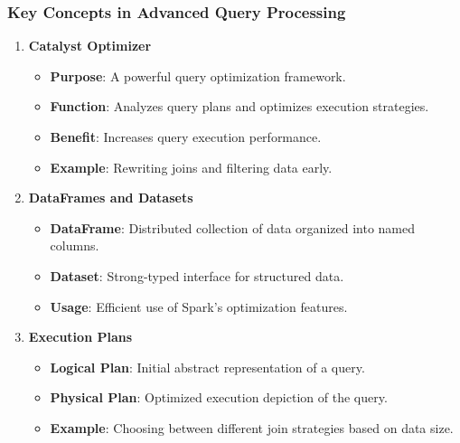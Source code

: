 \documentclass[aspectratio=169]{beamer}
\begin{document}
\begin{frame}[fragile]
    \frametitle{Key Concepts in Advanced Query Processing}

    \begin{enumerate}
        \item \textbf{Catalyst Optimizer}
            \begin{itemize}
                \item \textbf{Purpose}: A powerful query optimization framework.
                \item \textbf{Function}: Analyzes query plans and optimizes execution strategies.
                \item \textbf{Benefit}: Increases query execution performance.
                \item \textbf{Example}: Rewriting joins and filtering data early.
            \end{itemize}
        
        \item \textbf{DataFrames and Datasets}
            \begin{itemize}
                \item \textbf{DataFrame}: Distributed collection of data organized into named columns.
                \item \textbf{Dataset}: Strong-typed interface for structured data.
                \item \textbf{Usage}: Efficient use of Spark's optimization features.
            \end{itemize}
    
        \item \textbf{Execution Plans}
            \begin{itemize}
                \item \textbf{Logical Plan}: Initial abstract representation of a query.
                \item \textbf{Physical Plan}: Optimized execution depiction of the query.
                \item \textbf{Example}: Choosing between different join strategies based on data size.
            \end{itemize}
    \end{enumerate}
\end{frame}
\end{document}
